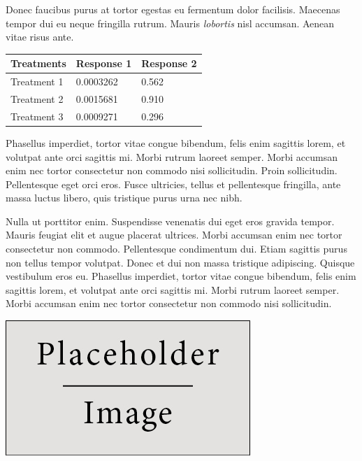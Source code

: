 \documentclass[a0,portrait]{a0poster}
\begin{document}
\begin{multicols}{2}
Donec faucibus purus at tortor egestas eu fermentum dolor facilisis. Maecenas tempor dui eu neque fringilla rutrum. Mauris \emph{lobortis} nisl accumsan. Aenean vitae risus ante.
%
\begin{table} %
\begin{tabular}{l l l}
\toprule
\textbf{Treatments} & \textbf{Response 1} & \textbf{Response 2}\\
\midrule
Treatment 1 & 0.0003262 & 0.562 \\
Treatment 2 & 0.0015681 & 0.910 \\
Treatment 3 & 0.0009271 & 0.296 \\
\bottomrule
\end{tabular}
\end{table}
%
Phasellus imperdiet, tortor vitae congue bibendum, felis enim sagittis lorem, et volutpat ante orci sagittis mi. Morbi rutrum laoreet semper. Morbi accumsan enim nec tortor consectetur non commodo nisi sollicitudin. Proin sollicitudin. Pellentesque eget orci eros. Fusce ultricies, tellus et pellentesque fringilla, ante massa luctus libero, quis tristique purus urna nec nibh.

Nulla ut porttitor enim. Suspendisse venenatis dui eget eros gravida tempor. Mauris feugiat elit et augue placerat ultrices. Morbi accumsan enim nec tortor consectetur non commodo. Pellentesque condimentum dui. Etiam sagittis purus non tellus tempor volutpat. Donec et dui non massa tristique adipiscing. Quisque vestibulum eros eu. Phasellus imperdiet, tortor vitae congue bibendum, felis enim sagittis lorem, et volutpat ante orci sagittis mi. Morbi rutrum laoreet semper. Morbi accumsan enim nec tortor consectetur non commodo nisi sollicitudin.

\begin{center}\vspace{1cm}
\includegraphics[width=0.8\linewidth]{placeholder}
\end{center}\vspace{1cm}


\end{multicols}
\end{document}
